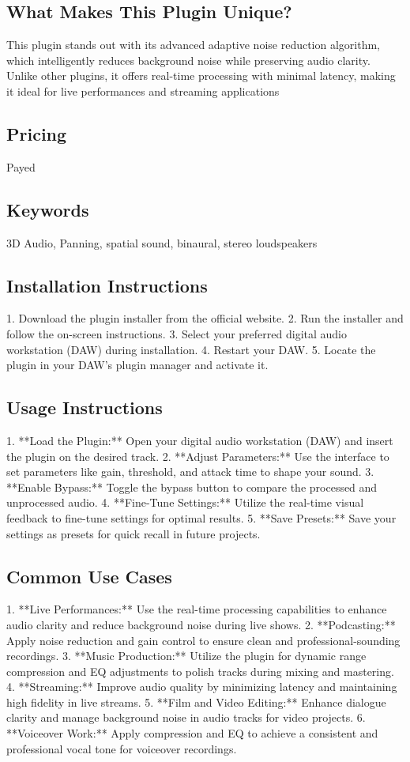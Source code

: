 \documentclass[8pt]{article}
\begin{document}
{{{{    \subsection*{What Makes This Plugin Unique?}
    This plugin stands out with its advanced adaptive noise reduction algorithm, which intelligently reduces background noise while preserving audio clarity. Unlike other plugins, it offers real-time processing with minimal latency, making it ideal for live performances and streaming applications

    \subsection*{Pricing}
    Payed

    \subsection*{Keywords}
    3D Audio, Panning, spatial sound, binaural, stereo loudspeakers

    \subsection*{Installation Instructions}
    1. Download the plugin installer from the official website.
2. Run the installer and follow the on-screen instructions.
3. Select your preferred digital audio workstation (DAW) during installation.
4. Restart your DAW.
5. Locate the plugin in your DAW’s plugin manager and activate it.

    \subsection*{Usage Instructions}
    1. **Load the Plugin:** Open your digital audio workstation (DAW) and insert the plugin on the desired track.
2. **Adjust Parameters:** Use the interface to set parameters like gain, threshold, and attack time to shape your sound.
3. **Enable Bypass:** Toggle the bypass button to compare the processed and unprocessed audio.
4. **Fine-Tune Settings:** Utilize the real-time visual feedback to fine-tune settings for optimal results.
5. **Save Presets:** Save your settings as presets for quick recall in future projects.

    \subsection*{Common Use Cases}
    1. **Live Performances:** Use the real-time processing capabilities to enhance audio clarity and reduce background noise during live shows.
2. **Podcasting:** Apply noise reduction and gain control to ensure clean and professional-sounding recordings.
3. **Music Production:** Utilize the plugin for dynamic range compression and EQ adjustments to polish tracks during mixing and mastering.
4. **Streaming:** Improve audio quality by minimizing latency and maintaining high fidelity in live streams.
5. **Film and Video Editing:** Enhance dialogue clarity and manage background noise in audio tracks for video projects.
6. **Voiceover Work:** Apply compression and EQ to achieve a consistent and professional vocal tone for voiceover recordings.

}}}}
\end{document}
